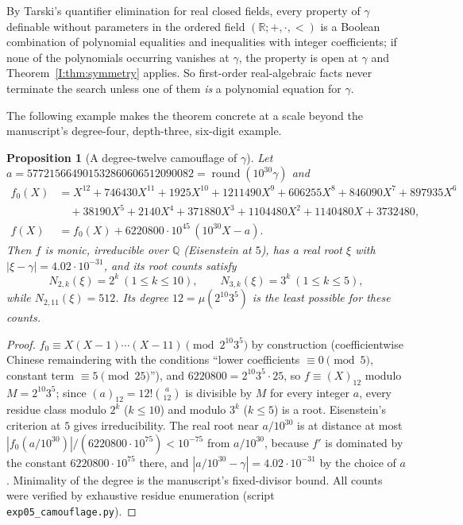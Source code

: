\documentclass[11pt,a4paper]{article}
\newcommand{\Q}{\mathbb Q}
\newcommand{\R}{\mathbb R}
\newtheorem{proposition}[theorem]{Proposition}
\theoremstyle{definition}
\theoremstyle{remark}
\numberwithin{equation}{section}
\begin{document}
By Tarski's quantifier elimination for real closed fields, every property of $\gamma$
definable without parameters in the ordered field $(\R;+,\cdot,<)$ is a Boolean combination
of polynomial equalities and inequalities with integer coefficients; if none of the
polynomials occurring vanishes at $\gamma$, the property is open at $\gamma$ and
Theorem~\ref{I:thm:symmetry} applies. So first-order real-algebraic facts never terminate the search unless one of them
\emph{is} a polynomial equation for $\gamma$.

The following example makes the theorem concrete at a scale beyond the manuscript's
degree-four, depth-three, six-digit example.

\begin{proposition}[A degree-twelve camouflage of $\gamma$]\label{I:prop:degree12}
Let $a=577215664901532860606512090082=\operatorname{round}(10^{30}\gamma)$ and
\begin{align*}
 f_0(X)&=X^{12}+746430X^{11}+1925X^{10}+1211490X^{9}+606255X^{8}+846090X^{7}+897935X^{6}\\
 &\quad+38190X^{5}+2140X^{4}+371880X^{3}+1104480X^{2}+1140480X+3732480,\\
 f(X)&=f_0(X)+6220800\cdot10^{45}\,(10^{30}X-a).
\end{align*}
Then $f$ is monic, irreducible over $\Q$ (Eisenstein at $5$), has a real root
$\xi$ with $|\xi-\gamma|=4.02\cdot10^{-31}$, and its root counts satisfy
\[
 N_{2,k}(\xi)=2^k\ (1\le k\le10),\qquad N_{3,k}(\xi)=3^k\ (1\le k\le5),
\]
while $N_{2,11}(\xi)=512$. Its degree $12=\mu(2^{10}3^5)$ is the least possible for these
counts.
\end{proposition}
\begin{proof}
$f_0\equiv X(X-1)\cdots(X-11)\pmod{2^{10}3^5}$ by construction (coefficientwise Chinese
remaindering with the conditions ``lower coefficients $\equiv0\pmod5$, constant term
$\equiv5\pmod{25}$''), and $6220800=2^{10}3^5\cdot25$, so $f\equiv(X)_{12}$ modulo
$M=2^{10}3^5$; since $(a)_{12}=12!\binom a{12}$ is divisible by $M$ for every integer $a$,
every residue class modulo $2^k$ ($k\le10$) and modulo $3^k$ ($k\le5$) is a root.
Eisenstein's criterion at $5$ gives irreducibility. The real root near $a/10^{30}$
is at distance at most $|f_0(a/10^{30})|/(6220800\cdot10^{75})<10^{-75}$ from $a/10^{30}$,
because $f'$ is dominated by the constant $6220800\cdot10^{75}$ there,
and $|a/10^{30}-\gamma|=4.02\cdot10^{-31}$ by the choice of $a$. Minimality of the degree is the manuscript's
fixed-divisor bound. All counts were verified by exhaustive residue enumeration
(script \texttt{exp05\_camouflage.py}).
\end{proof}
\end{document}

